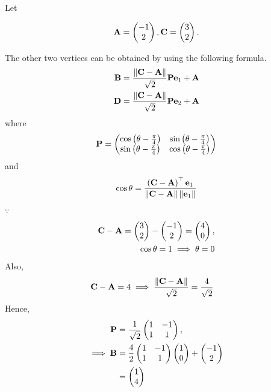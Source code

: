 Let 

\begin{align}
\mathbf{A}= \begin{pmatrix}-1\\2\end{pmatrix},  \mathbf{C}=\begin{pmatrix}3\\2\end{pmatrix}.
\end{align}

The other two vertices can be obtained by using the following formula. 
\begin{align}
  \label{eq:square_points}
  \mathbf{B} = \frac{\left\lVert\mathbf{C}-\mathbf{A}\right\rVert}{\sqrt{2}} \mathbf{P}\mathbf{e}_1+\mathbf{A}
  \\
  \mathbf{D} = \frac{\left\lVert\mathbf{C}-\mathbf{A}\right\rVert}{\sqrt{2}} \mathbf{P}\mathbf{e}_2+\mathbf{A}
\end{align}
where 
\begin{align}
	\mathbf{P} = \begin{pmatrix}\cos \left(\theta-\frac{\pi}{4}\right) & \sin  \left(\theta-\frac{\pi}{4}\right) \\ \sin \left(\theta-\frac{\pi}{4}\right) & \cos \left(\theta-\frac{\pi}{4}\right)\end{pmatrix}
\end{align}
and 
\begin{align}
	\cos\theta = \frac{\left(\mathbf{C}-\mathbf{A}\right)^{\top}\mathbf{e}_1}{\left\lVert\mathbf{C}-\mathbf{A}\right\rVert\left\lVert\mathbf{e}_1\right\rVert}
\end{align}
$\because $
\begin{align}
\mathbf{C}-\mathbf{A} = \begin{pmatrix}3\\2\end{pmatrix}- \begin{pmatrix}-1\\2\end{pmatrix} =  \begin{pmatrix}4\\0\end{pmatrix},
\\
\cos\theta  = 1 \implies \theta = 0
\end{align}
Also, 
\begin{align}
	\mathbf{C}-\mathbf{A} &=4 
	\implies \frac{\left\lVert\mathbf{C}-\mathbf{A}\right\rVert} {\sqrt{2}} = \frac{4}{\sqrt{2}}
\end{align}
Hence, 
\begin{align}
	\mathbf{P}&= \frac{1}{\sqrt{2}}\begin{pmatrix}1 & -1\\1 & 1\end{pmatrix}, 
	\\
	\implies \mathbf{B} &= \frac{4}{2}\begin{pmatrix}1 & -1\\1 & 1\end{pmatrix} \begin{pmatrix}1\\0\end{pmatrix}+ \begin{pmatrix}-1\\2\end{pmatrix}
	\\
			 &=\begin{pmatrix}1\\4\end{pmatrix}
\end{align}

